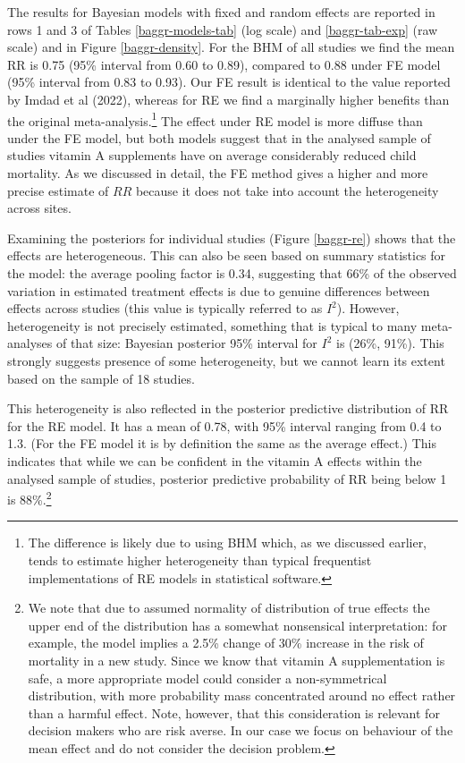 \documentclass[12pt]{article}
\begin{document}
The results for Bayesian models with fixed and random effects are reported in rows 1 and 3 of Tables \ref{baggr-models-tab} (log scale) and \ref{baggr-tab-exp} (raw scale) and in Figure \ref{baggr-density}. For the BHM of all studies we find the mean RR is 0.75 (95\% interval from 0.60 to 0.89), compared to 0.88 under FE model (95\% interval from 0.83 to 0.93). Our FE result is identical to the value reported by Imdad et al (2022), whereas for RE we find a marginally higher benefits than the original meta-analysis.\footnote{The difference is likely due to using BHM which, as we discussed earlier, tends to  estimate higher heterogeneity than typical frequentist implementations of RE models in statistical software.}
The effect under RE model is more diffuse than under the FE model, but both models suggest that in the analysed sample of studies vitamin A supplements have on average considerably reduced child mortality. As we discussed in detail, the FE method gives a higher and more precise estimate of $RR$ because it does not take into account the heterogeneity across sites. 

Examining the posteriors for individual studies (Figure \ref{baggr-re}) shows that the effects are heterogeneous. This can also be seen based on summary statistics for the model: the average pooling factor is 0.34, suggesting that 66\% of the observed variation in estimated treatment effects is due to genuine differences between effects across studies (this value is typically referred to as $I^2$). However, heterogeneity is not precisely estimated, something that is typical to many meta-analyses of that size: Bayesian posterior 95\% interval for $I^2$ is (26\%, 91\%). This strongly suggests presence of some heterogeneity, but we cannot learn its extent based on the sample of 18 studies.

This heterogeneity is also reflected in the posterior predictive distribution of RR for the RE model. It has a mean of 0.78, with 95\% interval ranging from 0.4 to 1.3. (For the FE model it is by definition the same as the average effect.) This indicates that while we can be confident in the vitamin A effects within the analysed sample of studies, posterior predictive probability of RR being below 1 is 88\%.\footnote{We note that due to assumed normality of distribution of true effects the upper end of the distribution has a somewhat nonsensical interpretation: for example, the model implies a 2.5\% change of 30\% increase in the risk of mortality in a new study. Since we know that vitamin A supplementation is safe, a more appropriate model could consider a non-symmetrical distribution, with more probability mass concentrated around no effect rather than a harmful effect. Note, however, that this consideration is relevant for decision makers who are risk averse. In our case we focus on behaviour of the mean effect and do not consider the decision problem.}
\end{document}
